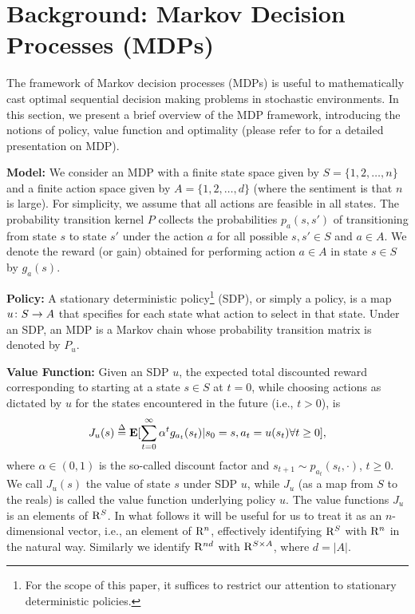 \section{Background: Markov Decision Processes (MDPs)}
The framework of Markov decision processes (MDPs) is useful to mathematically cast optimal sequential decision making problems in stochastic environments. In this section, we present a brief overview of the MDP framework, introducing the notions of policy, value function and optimality (please refer to \cite{BertB} for a detailed presentation on MDP).

\textbf{Model:} We consider an MDP with a finite state space given by $S=\{1,2,\ldots,n\}$ and a finite action space given by $A=\{1,2,\ldots,d\}$ (where the sentiment is that $n$ is large). For simplicity, we assume that all actions are feasible in all states. The probability transition kernel $P$ collects the probabilities $p_a(s,s')$ of transitioning from state $s$ to state $s'$ under the action $a$ for all possible $s,s'\in S$ and $a\in A$. We denote the reward (or gain) obtained for performing action $a\in A$ in state $s\in S$ by $g_a(s)$.

\textbf{Policy:} A stationary deterministic policy\footnote{For the scope of this paper, it suffices to restrict our attention to stationary deterministic policies.} (SDP), or simply a policy, is a map $u\colon S\rightarrow A$ that specifies for each state what action to select in that state. Under an SDP, an MDP is a Markov chain whose probability transition matrix is denoted by $P_u$.

\textbf{Value Function:} Given an SDP $u$, the expected total discounted reward corresponding to starting at a state $s\in S$ at $t=0$, while choosing actions as dictated by $u$ for the states encountered in the future (i.e., $t>0$), is
\begin{align}
J_u(s)\stackrel{\Delta}{=}\mathbf{E}[\sum_{t=0}^\infty \alpha^t g_{a_t}(s_t)|s_0=s,a_t=u(s_t)\relax{ }\forall t\geq 0],\nonumber
\end{align}
where $\alpha \in (0,1)$ is the so-called discount factor and $s_{t+1} \sim p_{a_t}(s_t,\cdot)$, $t\ge 0$.
We call $J_u(s)$ the value of state $s$ under SDP $u$, while $J_u$ (as a map from $S$ to the reals)
is called the value function underlying policy $u$. The value functions $J_u$ is an elements of $\mathrm{R}^S$. In what follows it will be useful for us to treat it as an $n$-dimensional vector, i.e., an element of $\mathrm{R}^n$, effectively identifying $\mathrm{R}^S$ with $\mathrm{R}^n$ in the natural way. Similarly we identify $\mathrm{R}^{nd}$ with $\mathrm{R}^{S\times A}$, where $d=|A|$.

